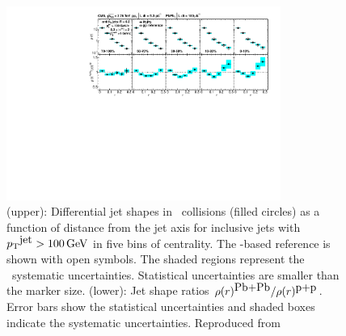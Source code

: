 \begin{figure}[!ht]
\begin{center}
\includegraphics[width=0.8\textwidth]{jetfigures/cms_shape_Figure2.pdf}
\caption{
%
(upper): Differential jet shapes in \PbPb\ collisions (filled circles)
as a function of distance from the jet axis for inclusive jets with $\mbox{$p_{\mathrm{T}}$}^{\mbox{jet}} >100\,\mathrm{GeV}$
in five bins of centrality.  The \pp-based reference is shown with open symbols.
The shaded regions represent the \PbPb\ systematic uncertainties.
Statistical uncertainties are smaller than the marker size.
(lower): Jet shape ratios $\rho(r)^{\mbox{Pb+Pb}}/\rho(r)^{\mbox{p+p}}$.
Error bars show the statistical uncertainties and shaded boxes indicate the systematic uncertainties. 
Reproduced from~\cite{Chatrchyan:2013kwa}
}
\end{center}
\end{figure}

